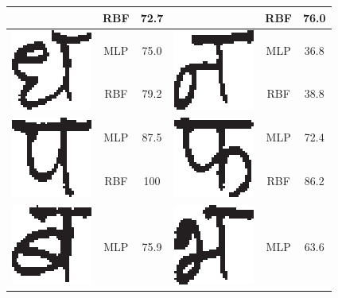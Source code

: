 \begin{table}[h]
\begin{tabular}{|c|c|c|c|c|c|}
\cline{2-3} \cline{5-6}
 & RBF & 72.7 &  & RBF & 76.0\tabularnewline
\hline
\multirow{2}{*}{\includegraphics[scale=0.25]{figures/datasets/nhcr/consonants/19dha}} & MLP & 75.0 & \multirow{2}{*}{\includegraphics[scale=0.25]{figures/datasets/nhcr/consonants/20na}} & MLP & 36.8\tabularnewline
\cline{2-3} \cline{5-6}
 & RBF & 79.2 &  & RBF & 38.8\tabularnewline
\hline
\multirow{2}{*}{\includegraphics[scale=0.25]{figures/datasets/nhcr/consonants/21pa}} & MLP & 87.5 & \multirow{2}{*}{\includegraphics[scale=0.25]{figures/datasets/nhcr/consonants/22pha}} & MLP & 72.4\tabularnewline
\cline{2-3} \cline{5-6}
 & RBF & 100 &  & RBF & 86.2\tabularnewline
\hline
\multirow{2}{*}{\includegraphics[scale=0.25]{figures/datasets/nhcr/consonants/23ba}} & MLP & 75.9 & \multirow{2}{*}{\includegraphics[scale=0.25]{figures/datasets/nhcr/consonants/24bha}} & MLP & 63.6\tabularnewline

\end{tabular}
\end{table}
